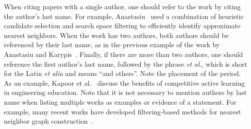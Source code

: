 When citing papers with a single author, one should refer to the work by citing the author's last name. For example, Anastasiu~\cite{anastasiu-idsc2017} used a combination of heuristic candidate selection and search space filtering to efficiently identify approximate nearest neighbors. When the work has two authors, both authors should be referenced by their last name, as in the previous example of the work by Anastasiu and Karypis~\cite{anastasiu-dsaa2016}. Finally, if there are more than two authors, one should reference the first author's last name, followed by the phrase \textit{et al.}, which is short for the Latin \textit{et alia} and means ``and others''. Note the placement of the period. As an example, Kapoor et al.~\cite{kapoor-fie2018} discuss the benefits of competitive active learning in engineering education. Note that it is not necessary to mention authors by last name when listing multiple works as examples or evidence of a statement. For example, many recent works have developed filtering-based methods for nearest neighbor graph construction~\cite{anastasiu-icde2014, anastasiu2015, anastasiu-sc2015, anastasiu-sc2016}.


